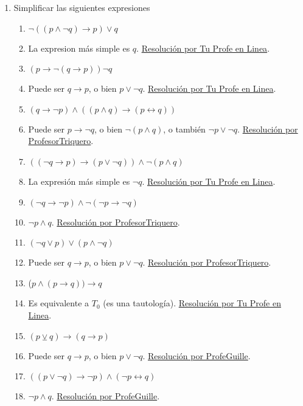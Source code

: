 \documentclass[a4paper]{article}
\newcommand{\answer}{\item[**]}
\newcommand{\exercise}{\item}
\newcommand{\then}{\to}
\newcommand{\eq}{\leftrightarrow}
\newcommand{\xor}{\veebar}
\begin{document}
\begin{enumerate}
\begin{multicols}{2}
\begin{enumerate} [label=(\alph*)]
	\end{enumerate}
	\end{multicols}

	\exercise Simplificar las siguientes expresiones
	\begin{multicols}{2}
	\begin{enumerate} [label=(\alph*)]

		\item $\neg ((p \land \neg q)\then p) \lor q$
		\answer La expresion más simple es $q$. \href{https://youtu.be/BOydu7cpv70}{Resolución por Tu Profe en Linea}.

		\item $( p \then \neg (q \then p) ) \neg q$
		\answer Puede ser $q \then p$, o bien $p \lor \neg q$. \href{https://youtu.be/BOydu7cpv70?t=334}{Resolución por Tu Profe en Linea}.

		\item $(q \then \neg p) \land ((p \land q)\then(p \eq q))$
		\answer Puede ser $p \then \neg q$, o bien $\neg ( p \land q )$, o también $\neg p \lor \neg q$. \href{https://youtu.be/p005yi28rgk?t=392}{Resolución por ProfesorTriquero}.

		\item $((\neg q \then p) \then (p \lor \neg q)) \land \neg (p \land q)$
		\answer La expresión más simple es $\neg q$. \href{https://youtu.be/BOydu7cpv70?t=884}{Resolución por Tu Profe en Linea}.

		\item $(\neg q \then \neg p) \land \neg (\neg p \then \neg q)$
		\answer $\neg p \land q$. \href{https://youtu.be/p005yi28rgk?t=737}{Resolución por ProfesorTriquero}.

		\item $(\neg q \lor p) \lor (p \land \neg q)$
		\answer Puede ser $q \then p$, o bien $p \lor \neg q$. \href{https://youtu.be/p005yi28rgk?t=995}{Resolución por ProfesorTriquero}.

		\item ($p \land ( p \then q)) \then q$
		\answer Es equivalente a $T_0$ (es una tautología). \href{https://youtu.be/BOydu7cpv70?t=586}{Resolución por Tu Profe en Linea}.

		\item $(p \xor q) \then (q \then p)$
		\answer Puede ser $q \then p$, o bien $p \lor \neg q$. \href{https://youtu.be/5r8S-wMJq7I}{Resolución por ProfeGuille}.

		\item $((p \lor \neg q) \then \neg p) \land (\neg p \eq q)$
		\answer $\neg p \land q$. \href{https://youtu.be/Ayk4qXcoiOM}{Resolución por ProfeGuille}.


\end{enumerate}
\end{multicols}
\end{enumerate}
\end{document}

